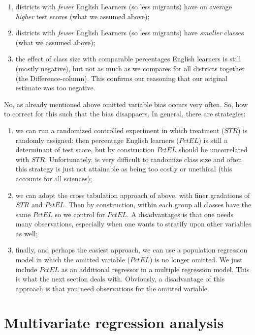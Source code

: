 \documentclass[
]{book}
\providecommand{\tightlist}{%
  \setlength{\itemsep}{0pt}\setlength{\parskip}{0pt}}
\begin{document}
\begin{enumerate}
\def\labelenumi{\arabic{enumi})}
\tightlist
\item
  districts with \emph{fewer} English Learners (so less migrants) have on average \emph{higher} test scores (what we assumed above);
\item
  districts with \emph{fewer} English Learners (so less migrants) have \emph{smaller} classes (what we assumed above);
\item
  the effect of class size with comparable percentages English learners is still (mostly negative), but not as much as we compares for all districts together (the Difference-column). This confirms our reasoning that our original estimate was too negative.
\end{enumerate}

No, as already mentioned above omitted variable bias occurs very often. So, how to correct for this such that the bias disappaers. In general, there are strategies:

\begin{enumerate}
\def\labelenumi{\arabic{enumi}.}
\tightlist
\item
  we can run a randomized controlled experiment in which treatment (\(STR\)) is randomly assigned: then percentage English learners (\(PctEL\)) is still a determinant of test score, but by construction \(PctEL\) should be uncorrelated with \(STR\). Unfortunately, is very difficult to randomize class size and often this strategy is just not attainable as being too costly or unethical (this accounts for all sciences);
\item
  we can adopt the cross tabulation approach of above, with finer gradations of \(STR\) and \(PctEL\). Then by construction, within each group all classes have the same \(PctEL\) so we control for \(PctEL\). A disadvantages is that one needs many observations, especially when one wants to stratify upon other variables as well;
\item
  finally, and perhaps the easiest approach, we can use a population regression model in which the omitted variable (\(PctEL\)) is no longer omitted. We just include \(PctEL\) as an additional regressor in a multiple regression model. This is what the next section deals with. Obviously, a disadvantage of this approach is that you need observations for the omitted variable.
\end{enumerate}

\hypertarget{sec:multivariate}{%
\section{Multivariate regression analysis}\label{sec:multivariate}}
\end{document}
